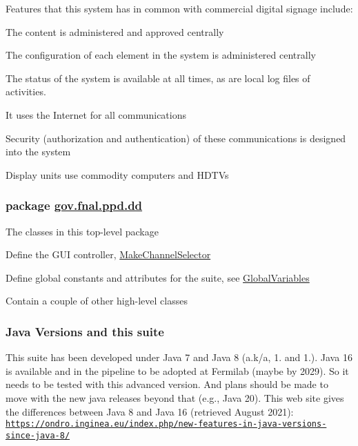 Features that this system has in common with commercial digital signage include\-: 
\begin{DoxyEnumerate}
\item The content is administered and approved centrally 
\item The configuration of each element in the system is administered centrally 
\item The status of the system is available at all times, as are local log files of activities. 
\item It uses the Internet for all communications 
\item Security (authorization and authentication) of these communications is designed into the system 
\item Display units use commodity computers and H\-D\-T\-Vs 
\end{DoxyEnumerate}

\subsubsection*{package \hyperlink{namespacegov_1_1fnal_1_1ppd_1_1dd}{gov.\-fnal.\-ppd.\-dd}}

The classes in this top-\/level package 
\begin{DoxyItemize}
\item Define the G\-U\-I controller, \hyperlink{classgov_1_1fnal_1_1ppd_1_1dd_1_1MakeChannelSelector}{Make\-Channel\-Selector} 
\item Define global constants and attributes for the suite, see \hyperlink{classgov_1_1fnal_1_1ppd_1_1dd_1_1GlobalVariables}{Global\-Variables} 
\item Contain a couple of other high-\/level classes 
\end{DoxyItemize}

\subsubsection*{Java Versions and this suite}

This suite has been developed under Java 7 and Java 8 (a.\-k/a, 1. and 1.). Java 16 is available and in the pipeline to be adopted at Fermilab (maybe by 2029). So it needs to be tested with this advanced version. And plans should be made to move with the new java releases beyond that (e.\-g., Java 20). This web site gives the differences between Java 8 and Java 16 (retrieved August 2021)\-: \href{https://ondro.inginea.eu/index.php/new-features-in-java-versions-since-java-8/}{\tt https\-://ondro.\-inginea.\-eu/index.\-php/new-\/features-\/in-\/java-\/versions-\/since-\/java-\/8/} 

